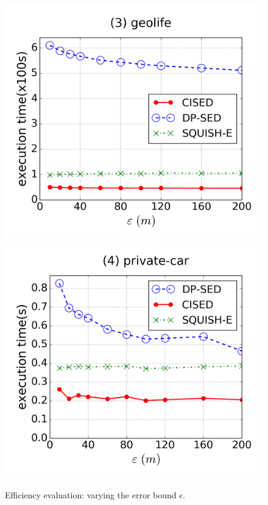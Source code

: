 \begin{figure}[tb!]
\includegraphics[scale = 0.25]{figures/Exp-time-epsilon-geolife.png}
\includegraphics[scale = 0.25]{figures/Exp-time-epsilon-private.png}
\vspace{-3ex}
\caption{\small Efficiency evaluation: varying the error bound $\epsilon$.}
\label{fig:time-epsilon}
\vspace{-1ex}
\end{figure}


